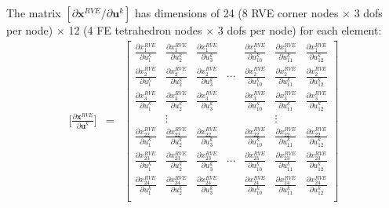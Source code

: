 \documentclass[12pt,aps,pre]{revtex4}
\begin{document}
The matrix $[\partial \pmb{x}^{RVE}/\partial \pmb{u}^k]$ has dimensions of 24 (8 RVE corner nodes $\times$ 3 dofs per node) $\times$ 12 (4 FE tetrahedron nodes $\times$ 3 dofs per node) for each element: 
%
\setcounter{MaxMatrixCols}{12}
\begin{eqnarray}
\bigg[ \frac{\partial \pmb{x}^{RVE}}{\partial \pmb{u}^k} \bigg] &=& 
\begin{bmatrix}
\frac{\partial x_1^{RVE}}{\partial u_1^k} & \frac{\partial x_1^{RVE}}{\partial u_2^k} & \frac{\partial x_1^{RVE}}{\partial u_3^k} & &
%
 \frac{\partial x_1^{RVE}}{\partial u_{10}^k} & \frac{\partial x_1^{RVE}}{\partial u_{11}^k} & \frac{\partial x_1^{RVE}}{\partial u_{12}^k} \\
\frac{\partial x_2^{RVE}}{\partial u_1^k} & \frac{\partial x_2^{RVE}}{\partial u_2^k} & \frac{\partial x_2^{RVE}}{\partial u_3^k} & \cdots &
%
\frac{\partial x_2^{RVE}}{\partial u_{10}^k} & \frac{\partial x_2^{RVE}}{\partial u_{11}^k} & \frac{\partial x_2^{RVE}}{\partial u_{12}^k} \\
\frac{\partial x_3^{RVE}}{\partial u_1^k} & \frac{\partial x_3^{RVE}}{\partial u_2^k} & \frac{\partial x_3^{RVE}}{\partial u_3^k} &  &
%
\frac{\partial x_3^{RVE}}{\partial u_{10}^k} & \frac{\partial x_3^{RVE}}{\partial u_{11}^k} & \frac{\partial x_3^{RVE}}{\partial u_{12}^k} \\
 & \vdots & & & & \vdots & \\
\frac{\partial x_{22}^{RVE}}{\partial u_1^k} & \frac{\partial x_{22}^{RVE}}{\partial u_2^k} & \frac{\partial x_{22}^{RVE}}{\partial u_3^k} & &
%
 \frac{\partial x_{22}^{RVE}}{\partial u_{10}^k} & \frac{\partial x_{22}^{RVE}}{\partial u_{11}^k} & \frac{\partial x_{22}^{RVE}}{\partial u_{12}^k} \\
\frac{\partial x_{23}^{RVE}}{\partial u_1^k} & \frac{\partial x_{23}^{RVE}}{\partial u_2^k} & \frac{\partial x_{23}^{RVE}}{\partial u_3^k} & \cdots &
%
\frac{\partial x_{23}^{RVE}}{\partial u_{10}^k} & \frac{\partial x_{23}^{RVE}}{\partial u_{11}^k} & \frac{\partial x_{23}^{RVE}}{\partial u_{12}^k} \\
\frac{\partial x_{24}^{RVE}}{\partial u_1^k} & \frac{\partial x_{24}^{RVE}}{\partial u_2^k} & \frac{\partial x_{24}^{RVE}}{\partial u_3^k} &  &
%
\frac{\partial x_{24}^{RVE}}{\partial u_{10}^k} & \frac{\partial x_{24}^{RVE}}{\partial u_{11}^k} & \frac{\partial x_{24}^{RVE}}{\partial u_{12}^k} \\
\end{bmatrix} \nonumber\\

\end{eqnarray}
\end{document}
